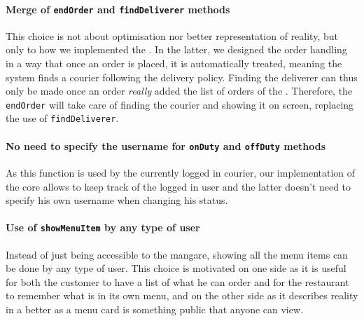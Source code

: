 \paragraph{Merge of \texttt{endOrder} and \texttt{findDeliverer} methods} %
\label{par:merge_of_endorder_and_finddeliverer}
This choice is not about optimisation nor better representation of reality,
but only to how we implemented the \Core.
In the latter, we designed the order handling in a way that once an order
is placed, it is automatically treated, meaning the system finds a courier
following the delivery policy.
Finding the deliverer can thus only be made once an order \emph{really}
added the list of orders of the \Core.
Therefore, the \lstinline|endOrder| will take care of finding the courier
and showing it on screen, replacing the use of \lstinline|findDeliverer|.

\paragraph{No need to specify the username for \texttt{onDuty}
and \texttt{offDuty} methods} %
\label{par:no_need_to_specify_the_username_for_lstinline_onduty_and_lstinline_offduty_methods}
As this function is used by the currently logged in courier,
our implementation of the core allows to keep track of the logged in user
and the latter doesn't need to specify his own username when changing his status.

\paragraph{Use of \texttt{showMenuItem} by any type of user} %
\label{par:use_of_lstinline_showmenuitem_by_any_type_of_user}
Instead of just being accessible to the mangare, showing all the menu
items can be done by any type of user.
This choice is motivated on one side as it is useful for both the customer
to have a list of what he can order and for the restaurant to remember what
is in its own menu, and on the other side as it describes reality in a better
as a menu card is something public that anyone can view.

